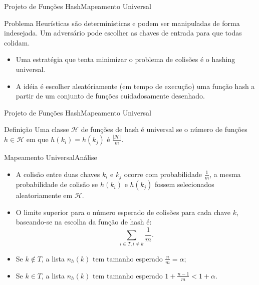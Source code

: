 \documentclass[aspectratio=169]{beamer}
\begin{document}
\begin{frame}{Projeto de Funções Hash}{Mapeamento Universal}
\begin{block}{Problema}
Heurísticas são determinísticas e podem ser manipuladas de forma indesejada. Um adversário pode escolher as chaves de entrada para que todas colidam.
\end{block}
\begin{itemize}
\item Uma estratégia que tenta minimizar o problema de colisões é o hashing universal.
\item A idéia é escolher aleatóriamente (em tempo de execução) uma função hash a partir de um conjunto de funções cuidadosamente desenhado.
\end{itemize}

\end{frame}

\begin{frame}{Projeto de Funções Hash}{Mapeamento Universal}
\begin{block}{Definição}
Uma classe $\mathcal{H}$ de funções de hash é universal se o número de funções $h \in \mathcal{H}$ em que $h(k_i) = h(k_j)$ é $\frac{|\mathcal{H}|}{m}$.
\end{block}
\end{frame}

\begin{frame}{Mapeamento Universal}{Análise}
\begin{itemize}
 \item A colisão entre duas chaves $k_i$ e $k_j$ ocorre com probabilidade  $\frac{1}{m}$, a mesma probabilidade de colisão se $h(k_i)$ e $h(k_j)$ fossem selecionados aleatoriamente em $\mathcal{H}$.
 \item O limite superior para o número esperado de colisões para cada chave $k$, baseando-se na escolha da função de hash é:
 \begin{equation}
  \sum_{i \in T, i \neq k} \frac{1}{m}. \nonumber
 \end{equation}
 \item Se $k \notin T$, a lista $n_h(k)$ tem tamanho esperado $\frac{n}{m} = \alpha$;
 \item Se $k \in T$, a lista $n_h(k)$ tem tamanho esperado $1 + \frac{n-1}{m} < 1+ \alpha$.
\end{itemize}
\end{frame}
\end{document}
